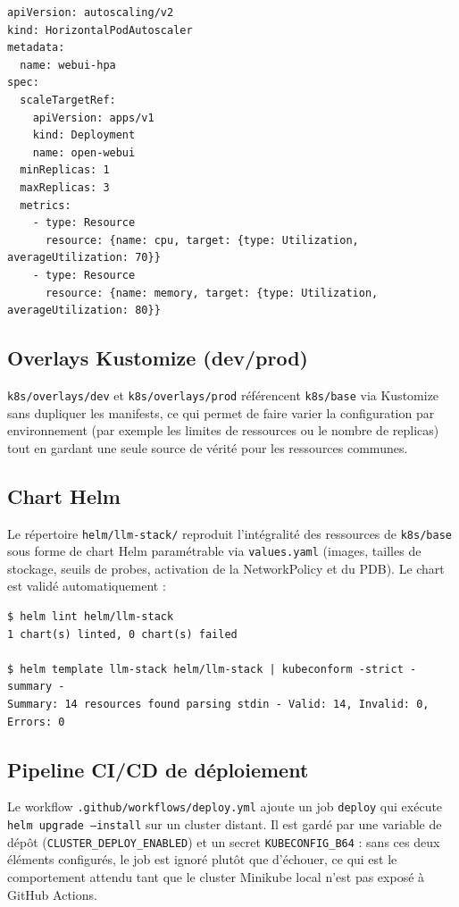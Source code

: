 \documentclass[11pt,a4paper]{article}
\begin{document}
\begin{lstlisting}
apiVersion: autoscaling/v2
kind: HorizontalPodAutoscaler
metadata:
  name: webui-hpa
spec:
  scaleTargetRef:
    apiVersion: apps/v1
    kind: Deployment
    name: open-webui
  minReplicas: 1
  maxReplicas: 3
  metrics:
    - type: Resource
      resource: {name: cpu, target: {type: Utilization, averageUtilization: 70}}
    - type: Resource
      resource: {name: memory, target: {type: Utilization, averageUtilization: 80}}
\end{lstlisting}

\subsection{Overlays Kustomize (dev/prod)}
\texttt{k8s/overlays/dev} et \texttt{k8s/overlays/prod} référencent \texttt{k8s/base} via Kustomize sans dupliquer les manifests, ce qui permet de faire varier la configuration par environnement (par exemple les limites de ressources ou le nombre de replicas) tout en gardant une seule source de vérité pour les ressources communes.

\subsection{Chart Helm}
Le répertoire \texttt{helm/llm-stack/} reproduit l'intégralité des ressources de \texttt{k8s/base} sous forme de chart Helm paramétrable via \texttt{values.yaml} (images, tailles de stockage, seuils de probes, activation de la NetworkPolicy et du PDB). Le chart est validé automatiquement :

\begin{lstlisting}
$ helm lint helm/llm-stack
1 chart(s) linted, 0 chart(s) failed

$ helm template llm-stack helm/llm-stack | kubeconform -strict -summary -
Summary: 14 resources found parsing stdin - Valid: 14, Invalid: 0, Errors: 0
\end{lstlisting}

\subsection{Pipeline CI/CD de déploiement}
Le workflow \texttt{.github/workflows/deploy.yml} ajoute un job \texttt{deploy} qui exécute \texttt{helm upgrade --install} sur un cluster distant. Il est gardé par une variable de dépôt (\texttt{CLUSTER\_DEPLOY\_ENABLED}) et un secret \texttt{KUBECONFIG\_B64} : sans ces deux éléments configurés, le job est ignoré plutôt que d'échouer, ce qui est le comportement attendu tant que le cluster Minikube local n'est pas exposé à GitHub Actions.
\end{document}

